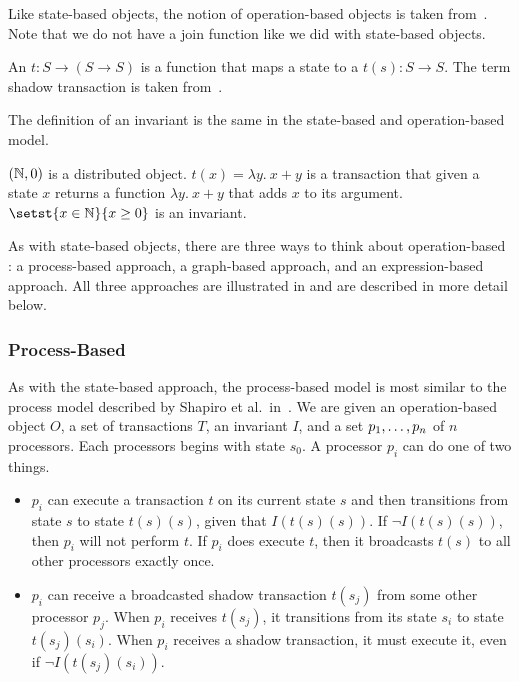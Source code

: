 Like state-based objects, the notion of operation-based objects is taken
from~\cite{shapiro2011conflict}. Note that we do not have a join function like
we did with state-based objects.

\begin{definition}
  An  $t: S \to (S \to S)$ is a function
  that maps a state to a  $t(s): S \to S$. The term
  shadow transaction is taken from~\cite{li2014automating}.
\end{definition}

The definition of an invariant is the same in the state-based and
operation-based model.

\begin{example}
  $(\mathbb{N}, 0)$ is a distributed object. $t(x) = \lambda y.\ x + y$ is a
  transaction that given a state $x$ returns a function $\lambda y.\ x + y$
  that adds $x$ to its argument. $\setst{x \in \nats}{x \geq 0}$ is an
  invariant.
\end{example}

As with state-based objects, there are three ways to think about
operation-based \Iconfluence{}: a process-based approach, a graph-based
approach, and an expression-based approach. All three approaches are
illustrated in  and are described in more detail below.



\subsubsection{Process-Based}
As with the state-based approach, the process-based model is most similar to
the process model described by Shapiro et al.\ in~\cite{shapiro2011conflict}.
We are given an operation-based object $O$, a set of transactions $T$, an
invariant $I$, and a set ${p}_{1}, \ldots, {p}_{n}$ of $n$ processors. Each processors
begins with state $s_0$. A processor $p_i$ can do one of two things.

\begin{itemize}
  \item
    $p_i$ can execute a transaction $t$ on its current state $s$ and then
    transitions from state $s$ to state $t(s)(s)$, given that $I(t(s)(s))$. If
    $\lnot I(t(s)(s))$, then $p_i$ will not perform $t$. If $p_i$ does execute
    $t$, then it broadcasts $t(s)$ to all other processors exactly once.

  \item
    $p_i$ can receive a broadcasted shadow transaction $t(s_j)$ from some other
    processor $p_j$. When $p_i$ receives $t(s_j)$, it transitions from its
    state $s_i$ to state $t(s_j)(s_i)$. When $p_i$ receives a shadow
    transaction, it must execute it, even if $\lnot I(t(s_j)(s_i))$.
\end{itemize}

